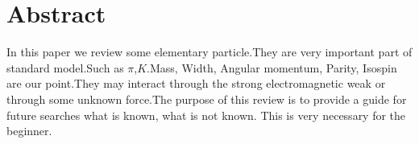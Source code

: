 \documentclass[
10pt, %
a4paper, %
oneside, %
headinclude,footinclude, %
BCOR5mm, %
]{scrartcl}
\title{\normalfont\spacedallcaps{Elementary particle}} %
\author{\spacedlowsmallcaps{Chenxi Gu*}} %
\date{} %
\begin{document}

\renewcommand{\sectionmark}[1]{\markright{\spacedlowsmallcaps{#1}}} %
\lehead{\mbox{\llap{\small\thepage\kern1em\color{halfgray} \vline}\color{halfgray}\hspace{0.5em}\rightmark\hfil}} %

\pagestyle{scrheadings} %


\maketitle %

\setcounter{tocdepth}{2} %

\tableofcontents %

\listoffigures %

\listoftables %


\section*{Abstract} %

In this paper we review some elementary particle.They are very important part of standard model.Such as $\pi$,$K$.Mass, Width, Angular momentum, Parity, Isospin are our point.They may interact through the strong electromagnetic weak or through some unknown force.The purpose of this review is to provide a guide for future searches what is known, what is not known. This is very necessary for the beginner.
\end{document}
